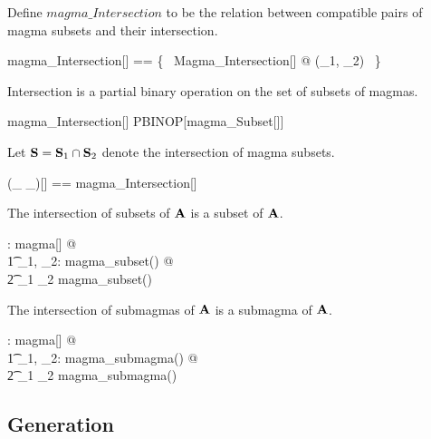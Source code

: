 \documentclass{amsart}
\begin{document}
Define $magma\_Intersection$ to be the relation between compatible pairs of magma subsets
and their intersection.

\begin{zed}
	magma\_Intersection[\genT] == \{~ Magma\_Intersection[\genT] @ (\strucS_1, \strucS_2) \mapsto \strucS ~\}
\end{zed}

\begin{remark}
Intersection is a partial binary operation on the set of subsets of magmas.

\begin{zed}
	magma\_Intersection[\setT] \in PBINOP[magma\_Subset[\setT]]
\end{zed}

\end{remark}

Let $\mathbf{S} = \mathbf{S}_1 \mathbin{\cap} \mathbf{S}_2$ denote the intersection of magma subsets.

\begin{zed}
	(\_ \capMagma \_)[\genT] == magma\_Intersection[\genT]
\end{zed}

\begin{remark}
The intersection of subsets of $\mathbf{A}$ is a subset of $\mathbf{A}$.

\begin{zed}
	\forall \strucA: magma[\setT] @ \\
	\t1	\forall \strucS_1, \strucS_2: magma\_subset(\strucA) @ \\
	\t2		\strucS_1 \capMagma \strucS_2 \in magma\_subset(\strucA)
\end{zed}

\end{remark}

\begin{remark}
The intersection of submagmas of $\mathbf{A}$ is a submagma of $\mathbf{A}$.

\begin{zed}
	\forall \strucA: magma[\setT] @ \\
	\t1	\forall \strucS_1, \strucS_2: magma\_submagma(\strucA) @ \\
	\t2		\strucS_1 \capMagma \strucS_2 \in magma\_submagma(\strucA)
\end{zed}

\end{remark}

\subsection{Generation}
\end{document}
